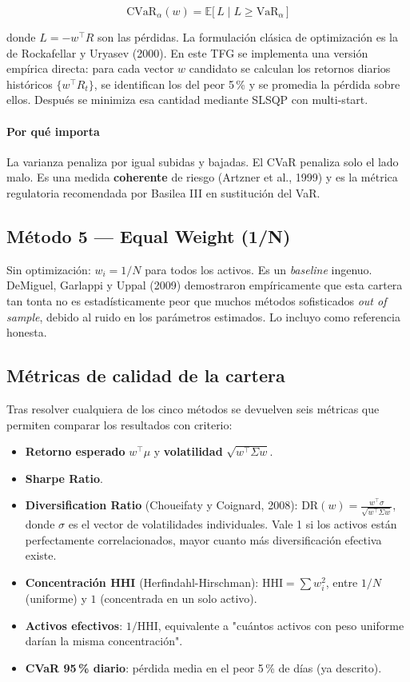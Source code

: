 \documentclass[11pt,a4paper]{article}
\begin{document}
\begin{equation}
\mathrm{CVaR}_\alpha(w) = \mathbb{E}\big[\,L \;|\; L \ge \mathrm{VaR}_\alpha\,\big]
\end{equation}

donde $L = -w^\top R$ son las pérdidas. La formulación clásica de optimización es la de Rockafellar y Uryasev (2000). En este TFG se implementa una versión empírica directa: para cada vector $w$ candidato se calculan los retornos diarios históricos $\{w^\top R_t\}$, se identifican los del peor 5\,\% y se promedia la pérdida sobre ellos. Después se minimiza esa cantidad mediante SLSQP con multi-start.

\paragraph{Por qué importa}
La varianza penaliza por igual subidas y bajadas. El CVaR penaliza solo el lado malo. Es una medida \textbf{coherente} de riesgo (Artzner et al., 1999) y es la métrica regulatoria recomendada por Basilea III en sustitución del VaR.

\subsection{Método 5 — Equal Weight (1/N)}

Sin optimización: $w_i = 1/N$ para todos los activos. Es un \textit{baseline} ingenuo. DeMiguel, Garlappi y Uppal (2009) demostraron empíricamente que esta cartera tan tonta no es estadísticamente peor que muchos métodos sofisticados \textit{out of sample}, debido al ruido en los parámetros estimados. Lo incluyo como referencia honesta.

\subsection{Métricas de calidad de la cartera}

Tras resolver cualquiera de los cinco métodos se devuelven seis métricas que permiten comparar los resultados con criterio:

\begin{itemize}
  \item \textbf{Retorno esperado} $w^\top\mu$ y \textbf{volatilidad} $\sqrt{w^\top \Sigma w}$.
  \item \textbf{Sharpe Ratio}.
  \item \textbf{Diversification Ratio} (Choueifaty y Coignard, 2008): $\mathrm{DR}(w) = \frac{w^\top \sigma}{\sqrt{w^\top \Sigma w}}$, donde $\sigma$ es el vector de volatilidades individuales. Vale 1 si los activos están perfectamente correlacionados, mayor cuanto más diversificación efectiva existe.
  \item \textbf{Concentración HHI} (Herfindahl-Hirschman): $\mathrm{HHI} = \sum w_i^2$, entre $1/N$ (uniforme) y $1$ (concentrada en un solo activo).
  \item \textbf{Activos efectivos}: $1/\mathrm{HHI}$, equivalente a "cuántos activos con peso uniforme darían la misma concentración".
  \item \textbf{CVaR 95\,\% diario}: pérdida media en el peor 5\,\% de días (ya descrito).
\end{itemize}
\end{document}
